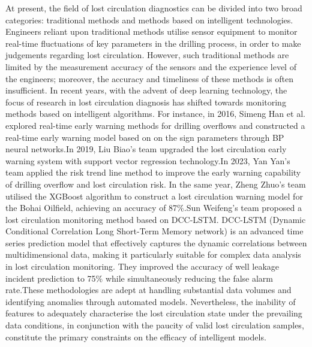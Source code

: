 \documentclass[journal,article,submit,pdftex,moreauthors]{Definitions/mdpi}
\begin{document}
At present, the field of lost circulation diagnostics can be divided into two broad categories: traditional methods and methods based on intelligent technologies. Engineers reliant upon traditional methods utilise sensor equipment to monitor real-time fluctuations of key parameters in the drilling process, in order to make judgements regarding lost circulation. However, such traditional methods are limited by the measurement accuracy of the sensors and the experience level of the engineers; moreover, the accuracy and timeliness of these methods is often insufficient. In recent years, with the advent of deep learning technology, the focus of research in lost circulation diagnosis has shifted towards monitoring methods based on intelligent algorithms. For instance, in 2016, Simeng Han et al.\cite{simeng2016}  explored real-time early warning methods for drilling overflows and constructed a real-time early warning model based on on the sign parameters through BP neural networks.In 2019, Liu Biao's team\cite{liubiao2019} upgraded the lost circulation early warning system with support vector regression technology.In 2023, Yan Yan's team\cite{yandan2023} applied the risk trend line method to improve the early warning capability of drilling overflow and lost circulation risk. In the same year, Zheng Zhuo's team \cite{zhengzhuo2023}utilised the XGBoost algorithm to construct a lost circulation warning model for the Bohai Oilfield, achieving an accuracy of 87\%.Sun Weifeng's team \cite{sunweifeng2023} proposed a lost circulation monitoring method based on DCC-LSTM. DCC-LSTM (Dynamic Conditional Correlation Long Short-Term Memory network) is an advanced time series prediction model that effectively captures the dynamic correlations between multidimensional data, making it particularly suitable for complex data analysis in lost circulation monitoring. They improved the accuracy of well leakage incident prediction to 75\% while simultaneously reducing the false alarm rate.These methodologies are adept at handling substantial data volumes and identifying anomalies through automated models. Nevertheless, the inability of features to adequately characterise the lost circulation state under the prevailing data conditions, in conjunction with the paucity of valid lost circulation samples, constitute the primary constraints on the efficacy of intelligent models.
\end{document}
